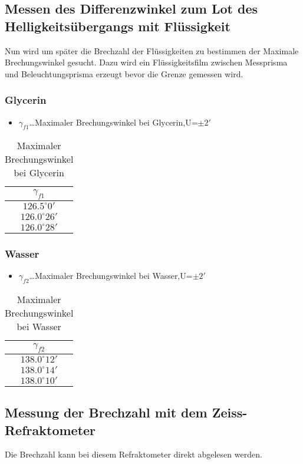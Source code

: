 \documentclass[a4paper]{article}
\begin{document}
\subsection{Messen des Differenzwinkel zum Lot des Helligkeitsübergangs mit Flüssigkeit}
Nun wird um später die Brechzahl der Flüssigkeiten zu bestimmen der Maximale Brechungswinkel gesucht. Dazu wird ein Flüssigkeitsfilm zwischen Messprisma und Beleuchtungsprisma erzeugt bevor die Grenze gemessen wird.
\subsubsection{Glycerin}
\begin{table}[ht]
  \centering
  \caption{Maximaler Brechungswinkel bei Glycerin}
  \begin{itemize}
    \item $\gamma_{f1}$\dots Maximaler Brechungswinkel bei Glycerin,U=$\pm2'$
  \end{itemize}
  \begin{tabular}{|c|}\hline
    $\gamma_{f1}$\\\hline
    $126.5^\circ 0'$\\	\hline
    $126.0^\circ 26'$\\	\hline
    $126.0^\circ 28'$\\	\hline
  \end{tabular}
  \label{tab:glycerin}
\end{table}
\subsubsection{Wasser}
\begin{table}[ht]
  \centering
  \caption{Maximaler Brechungswinkel bei Wasser}
  \begin{itemize}
    \item $\gamma_{f2}$\dots Maximaler Brechungswinkel bei Wasser,U=$\pm2'$
  \end{itemize}
  \begin{tabular}{|c|}\hline
    $\gamma_{f2}$\\\hline
    $138.0^\circ 12'$\\	\hline
    $138.0^\circ 14'$\\	\hline
    $138.0^\circ 10'$\\	\hline
  \end{tabular}
  \label{tab:wasser}
\end{table}

\subsection{Messung der Brechzahl mit dem Zeiss-Refraktometer}
Die Brechzahl kann bei diesem Refraktometer direkt abgelesen werden.
\end{document}
